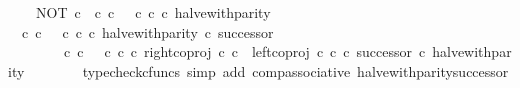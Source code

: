 \begin{isabellebody}
\ \ \ \ NOT\ {\isasymcirc}\isactrlsub c\ {\isacharparenleft}{\kern0pt}{\isasymt}\ {\isasymcirc}\isactrlsub c\ {\isasymbeta}\isactrlbsub {\isasymnat}\isactrlsub c\isactrlesub {\isacharparenright}{\kern0pt}\ {\isasymamalg}\ {\isacharparenleft}{\kern0pt}{\isasymf}\ {\isasymcirc}\isactrlsub c\ {\isasymbeta}\isactrlbsub {\isasymnat}\isactrlsub c\isactrlesub {\isacharparenright}{\kern0pt}\ {\isasymcirc}\isactrlsub c\ halve{\isacharunderscore}{\kern0pt}with{\isacharunderscore}{\kern0pt}parity{\isachardoublequoteclose}\isanewline
\ \ \isamarkupfalse%
\ {\isacharminus}{\kern0pt}\isanewline
\ \ \ \ \isamarkupfalse%
\ {\isachardoublequoteopen}{\isacharparenleft}{\kern0pt}{\isacharparenleft}{\kern0pt}{\isasymt}\ {\isasymcirc}\isactrlsub c\ {\isasymbeta}\isactrlbsub {\isasymnat}\isactrlsub c\isactrlesub {\isacharparenright}{\kern0pt}\ {\isasymamalg}\ {\isacharparenleft}{\kern0pt}{\isasymf}\ {\isasymcirc}\isactrlsub c\ {\isasymbeta}\isactrlbsub {\isasymnat}\isactrlsub c\isactrlesub {\isacharparenright}{\kern0pt}\ {\isasymcirc}\isactrlsub c\ halve{\isacharunderscore}{\kern0pt}with{\isacharunderscore}{\kern0pt}parity{\isacharparenright}{\kern0pt}\ {\isasymcirc}\isactrlsub c\ successor\isanewline
\ \ \ \ \ \ {\isacharequal}{\kern0pt}\ {\isacharparenleft}{\kern0pt}{\isasymt}\ {\isasymcirc}\isactrlsub c\ {\isasymbeta}\isactrlbsub {\isasymnat}\isactrlsub c\isactrlesub {\isacharparenright}{\kern0pt}\ {\isasymamalg}\ {\isacharparenleft}{\kern0pt}{\isasymf}\ {\isasymcirc}\isactrlsub c\ {\isasymbeta}\isactrlbsub {\isasymnat}\isactrlsub c\isactrlesub {\isacharparenright}{\kern0pt}\ {\isasymcirc}\isactrlsub c\ {\isacharparenleft}{\kern0pt}right{\isacharunderscore}{\kern0pt}coproj\ {\isasymnat}\isactrlsub c\ {\isasymnat}\isactrlsub c\ {\isasymamalg}\ {\isacharparenleft}{\kern0pt}left{\isacharunderscore}{\kern0pt}coproj\ {\isasymnat}\isactrlsub c\ {\isasymnat}\isactrlsub c\ {\isasymcirc}\isactrlsub c\ successor{\isacharparenright}{\kern0pt}{\isacharparenright}{\kern0pt}\ {\isasymcirc}\isactrlsub c\ halve{\isacharunderscore}{\kern0pt}with{\isacharunderscore}{\kern0pt}parity{\isachardoublequoteclose}\isanewline
\ \ \ \ \ \ \isamarkupfalse%
\ {\isacharparenleft}{\kern0pt}typecheck{\isacharunderscore}{\kern0pt}cfuncs{\isacharcomma}{\kern0pt}\ simp\ add{\isacharcolon}{\kern0pt}\ comp{\isacharunderscore}{\kern0pt}associative{}\ halve{\isacharunderscore}{\kern0pt}with{\isacharunderscore}{\kern0pt}parity{\isacharunderscore}{\kern0pt}successor{\isacharparenright}{\kern0pt}\isanewline
\ \ \ \ \isamarkupfalse%
\ \isamarkupfalse%

\end{isabellebody}
